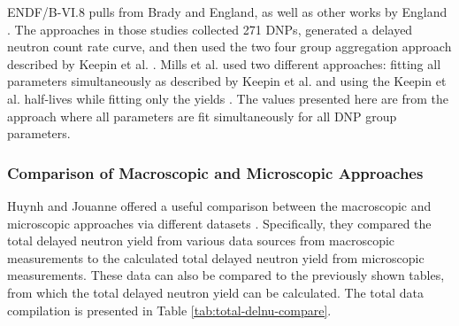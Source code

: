 ENDF/B-VI.8 pulls from Brady and England, as well as other works by England \cite{endf6, brady1989delayed, england1988status, brady1989validation}.
The approaches in those studies collected 271 \glspl{DNP}, generated a delayed neutron count rate curve, and then used the two four group aggregation approach described by Keepin et al. \cite{keepin1957delayed, brady1989delayed}.
Mills et al. used two different approaches: fitting all parameters simultaneously as described by Keepin et al. and using the Keepin et al. half-lives while fitting only the yields \cite{mills1991study, keepin1957delayed}.
The values presented here are from the approach where all parameters are fit simultaneously for all \gls{DNP} group parameters.

\FloatBarrier


\subsubsection{Comparison of Macroscopic and Microscopic Approaches}

Huynh and Jouanne offered a useful comparison between the macroscopic and microscopic approaches via different datasets \cite{huynh2014calculation}.
Specifically, they compared the total delayed neutron yield from various data sources from macroscopic measurements to the calculated total delayed neutron yield from microscopic measurements.
These data can also be compared to the previously shown tables, from which the total delayed neutron yield can be calculated.
The total data compilation is presented in Table \ref{tab:total-delnu-compare}.

